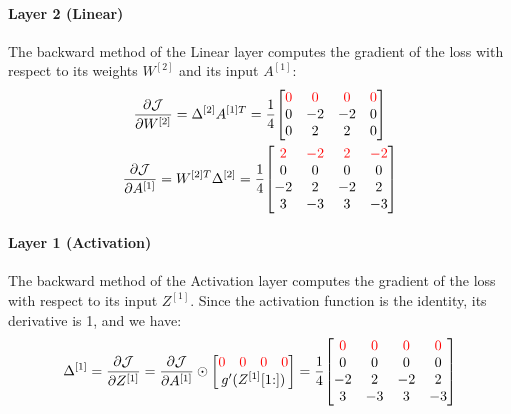 \paragraph{Layer 2 (Linear)} The backward method of the Linear layer computes the gradient of the loss with respect to its weights $W^{[2]}$ and its input $A^{[1]}$:
\begin{gather*}
    \pdv{\J}{W^{[2]}} = \Delta^{[2]} A^{[1]T} = \frac{1}{4} \mqty[
        \color{red} 0 & \color{red} 0 & \color{red} 0 & \color{red} 0 \\
        0 & -2 & -2 & 0 \\
        0 & 2 & 2 & 0 \\
    ]\\
    \pdv{\J}{A^{[1]}} = W^{[2]T} \Delta^{[2]} = \frac{1}{4} \mqty[
        \color{red} 2 & \color{red} -2 & \color{red} 2 & \color{red} -2 \\
        0 & 0 & 0 & 0 \\
        -2 & 2 & -2 & 2 \\
        3 & -3 & 3 & -3 \\
    ]
\end{gather*}

\paragraph{Layer 1 (Activation)} The backward method of the Activation layer computes the gradient of the loss with respect to its input $Z^{[1]}$. Since the activation function is the identity, its derivative is 1, and we have:
\begin{equation*}
    \Delta^{[1]} = \pdv{\J}{Z^{[1]}} = \pdv{\J}{A^{[1]}} \odot \mqty[
        \mqty{\color{red} 0 & \color{red} 0 & \color{red} 0 & \color{red} 0} \\
        g'(Z^{[1]}[1\hspace{-0.6ex}:])
    ] = \frac{1}{4} \mqty[
        \color{red} 0 & \color{red} 0 & \color{red} 0 & \color{red} 0 \\
        0 & 0 & 0 & 0 \\
        -2 & 2 & -2 & 2 \\
        3 & -3 & 3 & -3 \\
    ]
\end{equation*}

